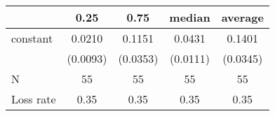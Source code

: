 \begin{tabular}{lcccc}
\hline
          &   0.25   &   0.75   &  median  & average   \\
\midrule
\midrule
constant  & 0.0210   & 0.1151   & 0.0431   & 0.1401    \\
          & (0.0093) & (0.0353) & (0.0111) & (0.0345)  \\
N         & 55       & 55       & 55       & 55        \\
Loss rate & 0.35     & 0.35     & 0.35     & 0.35      \\
\hline
\end{tabular}
